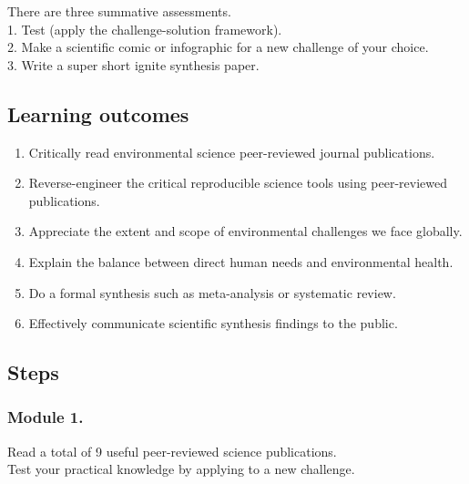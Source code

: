 \documentclass[
]{book}
\providecommand{\tightlist}{%
  \setlength{\itemsep}{0pt}\setlength{\parskip}{0pt}}
\begin{document}
There are three summative assessments.\\
1. Test (apply the challenge-solution framework).\\
2. Make a scientific comic or infographic for a new challenge of your choice.\\
3. Write a super short ignite synthesis paper.

\hypertarget{learning-outcomes}{%
\subsection*{Learning outcomes}\label{learning-outcomes}}

\begin{enumerate}
\def\labelenumi{\arabic{enumi}.}
\tightlist
\item
  Critically read environmental science peer-reviewed journal publications.\\
\item
  Reverse-engineer the critical reproducible science tools using peer-reviewed publications.\\
\item
  Appreciate the extent and scope of environmental challenges we face globally.\\
\item
  Explain the balance between direct human needs and environmental health.\\
\item
  Do a formal synthesis such as meta-analysis or systematic review.\\
\item
  Effectively communicate scientific synthesis findings to the public.
\end{enumerate}

\hypertarget{steps}{%
\subsection*{Steps}\label{steps}}

\hypertarget{module-1.}{%
\subsubsection*{Module 1.}\label{module-1.}}

Read a total of 9 useful peer-reviewed science publications.\\
Test your practical knowledge by applying to a new challenge.
\end{document}
